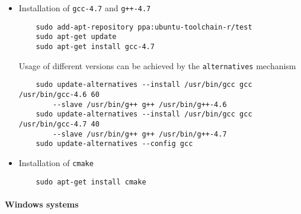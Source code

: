 \documentclass[a4paper,10pt]{article}
\begin{document}
\begin{itemize}
\item Installation of \texttt{gcc-4.7} and \texttt{g++-4.7}
	\begin{verbatim}
	sudo add-apt-repository ppa:ubuntu-toolchain-r/test
	sudo apt-get update
	sudo apt-get install gcc-4.7
	\end{verbatim}

	Usage of different versions can be achieved by the \texttt{alternatives} mechanism

	\begin{verbatim}
	sudo update-alternatives --install /usr/bin/gcc gcc /usr/bin/gcc-4.6 60 
		--slave /usr/bin/g++ g++ /usr/bin/g++-4.6 
	sudo update-alternatives --install /usr/bin/gcc gcc /usr/bin/gcc-4.7 40 
		--slave /usr/bin/g++ g++ /usr/bin/g++-4.7 
	sudo update-alternatives --config gcc
	\end{verbatim}

\item Installation of \texttt{cmake}
	\begin{verbatim}
	sudo apt-get install cmake
	\end{verbatim}
\end{itemize}

\paragraph{Windows systems}
\end{document}
